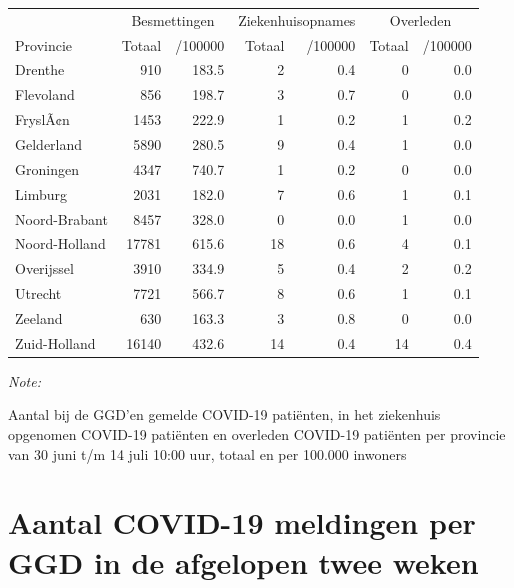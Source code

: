 \documentclass[
  english,
  man,floatsintext]{apa6}
\begin{document}
\begin{table}
\centering
\begin{threeparttable}
\begin{tabular}{lrrrrrr}
\toprule
\multicolumn{1}{c}{ } & \multicolumn{2}{c}{Besmettingen} & \multicolumn{2}{c}{Ziekenhuisopnames} & \multicolumn{2}{c}{Overleden} \\
\cmidrule(l{3pt}r{3pt}){2-3} \cmidrule(l{3pt}r{3pt}){4-5} \cmidrule(l{3pt}r{3pt}){6-7}
Provincie & Totaal & /100000 & Totaal & /100000 & Totaal & /100000\\
\midrule
Drenthe & 910 & 183.5 & 2 & 0.4 & 0 & 0.0\\
Flevoland & 856 & 198.7 & 3 & 0.7 & 0 & 0.0\\
FryslÃ¢n & 1453 & 222.9 & 1 & 0.2 & 1 & 0.2\\
Gelderland & 5890 & 280.5 & 9 & 0.4 & 1 & 0.0\\
Groningen & 4347 & 740.7 & 1 & 0.2 & 0 & 0.0\\
Limburg & 2031 & 182.0 & 7 & 0.6 & 1 & 0.1\\
Noord-Brabant & 8457 & 328.0 & 0 & 0.0 & 1 & 0.0\\
Noord-Holland & 17781 & 615.6 & 18 & 0.6 & 4 & 0.1\\
Overijssel & 3910 & 334.9 & 5 & 0.4 & 2 & 0.2\\
Utrecht & 7721 & 566.7 & 8 & 0.6 & 1 & 0.1\\
Zeeland & 630 & 163.3 & 3 & 0.8 & 0 & 0.0\\
Zuid-Holland & 16140 & 432.6 & 14 & 0.4 & 14 & 0.4\\
\bottomrule
\end{tabular}
\begin{tablenotes}
\item \textit{Note: } 
\item Aantal bij de GGD’en gemelde COVID-19 patiënten, in het ziekenhuis opgenomen COVID-19 patiënten en overleden COVID-19 patiënten per provincie van 30 juni t/m 14 juli 10:00 uur, totaal en per 100.000 inwoners
\end{tablenotes}
\end{threeparttable}
\end{table}

\newpage

\hypertarget{aantal-covid-19-meldingen-per-ggd-in-de-afgelopen-twee-weken}{%
\section{Aantal COVID-19 meldingen per GGD in de afgelopen twee weken}\label{aantal-covid-19-meldingen-per-ggd-in-de-afgelopen-twee-weken}}
\end{document}
